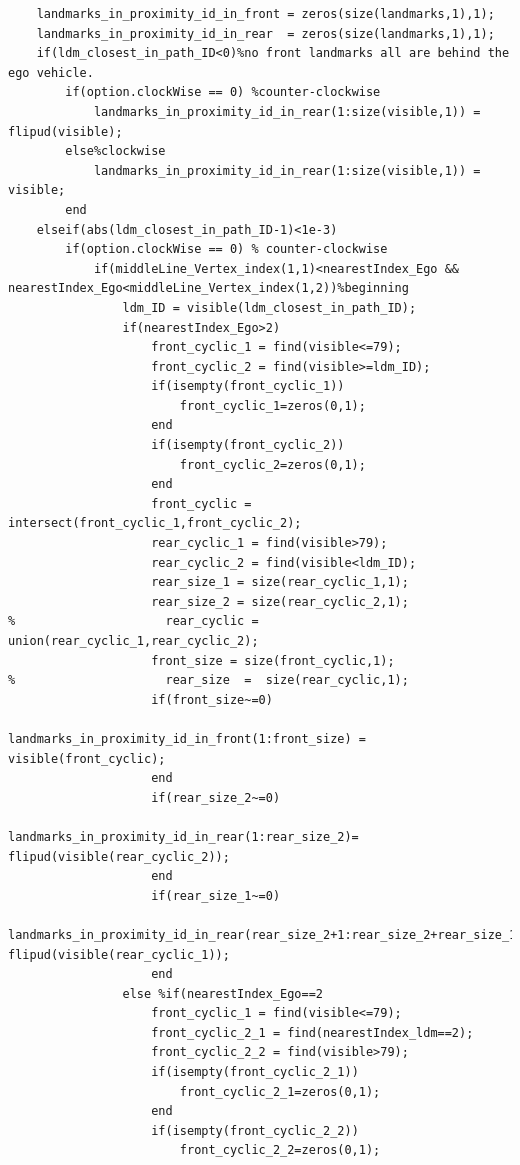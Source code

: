 \documentclass[12pt,a4paper]{article}
\begin{document}
{{{\begin{verbatim}
    landmarks_in_proximity_id_in_front = zeros(size(landmarks,1),1);
    landmarks_in_proximity_id_in_rear  = zeros(size(landmarks,1),1); 
    if(ldm_closest_in_path_ID<0)%no front landmarks all are behind the ego vehicle.
        if(option.clockWise == 0) %counter-clockwise
            landmarks_in_proximity_id_in_rear(1:size(visible,1)) = flipud(visible);
        else%clockwise
            landmarks_in_proximity_id_in_rear(1:size(visible,1)) = visible;
        end 
    elseif(abs(ldm_closest_in_path_ID-1)<1e-3)
        if(option.clockWise == 0) % counter-clockwise
            if(middleLine_Vertex_index(1,1)<nearestIndex_Ego && nearestIndex_Ego<middleLine_Vertex_index(1,2))%beginning
                ldm_ID = visible(ldm_closest_in_path_ID);
                if(nearestIndex_Ego>2)
                    front_cyclic_1 = find(visible<=79);
                    front_cyclic_2 = find(visible>=ldm_ID);
                    if(isempty(front_cyclic_1))
                        front_cyclic_1=zeros(0,1);
                    end
                    if(isempty(front_cyclic_2))
                        front_cyclic_2=zeros(0,1);
                    end
                    front_cyclic = intersect(front_cyclic_1,front_cyclic_2);
                    rear_cyclic_1 = find(visible>79);
                    rear_cyclic_2 = find(visible<ldm_ID);
                    rear_size_1 = size(rear_cyclic_1,1);
                    rear_size_2 = size(rear_cyclic_2,1);
%                     rear_cyclic = union(rear_cyclic_1,rear_cyclic_2);
                    front_size = size(front_cyclic,1);
%                     rear_size  =  size(rear_cyclic,1);
                    if(front_size~=0)                                   
                        landmarks_in_proximity_id_in_front(1:front_size) = visible(front_cyclic);
                    end
                    if(rear_size_2~=0)
                        landmarks_in_proximity_id_in_rear(1:rear_size_2)= flipud(visible(rear_cyclic_2));
                    end
                    if(rear_size_1~=0)
                        landmarks_in_proximity_id_in_rear(rear_size_2+1:rear_size_2+rear_size_1)= flipud(visible(rear_cyclic_1));
                    end
                else %if(nearestIndex_Ego==2
                    front_cyclic_1 = find(visible<=79);
                    front_cyclic_2_1 = find(nearestIndex_ldm==2);
                    front_cyclic_2_2 = find(visible>79);
                    if(isempty(front_cyclic_2_1))
                        front_cyclic_2_1=zeros(0,1);
                    end
                    if(isempty(front_cyclic_2_2))
                        front_cyclic_2_2=zeros(0,1);

\end{verbatim}}}}
\end{document}
